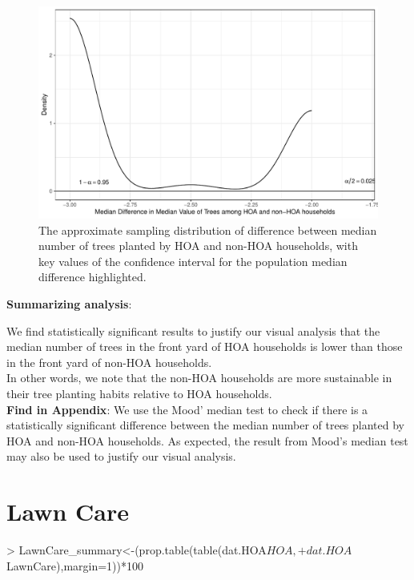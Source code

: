 \documentclass{article}
\begin{document}
\begin{figure}[H]
\centering
\includegraphics{part2-012}
\caption{The approximate sampling distribution of difference between median number of trees planted by HOA and non-HOA households, with key values of the confidence interval for the population median difference highlighted.} \label{Fig:plot1}
\end{figure}

\textbf{Summarizing analysis}: 

We find statistically significant results to justify our visual analysis that the median number of trees in the front yard of HOA households is lower than those in the front yard of non-HOA households.\\

In other words, we note that the non-HOA households are more sustainable in their tree planting habits relative to HOA households.\\

\textbf{Find in Appendix}: We use the Mood' median test to check if there is a statistically significant difference between the median number of trees planted by HOA and non-HOA households. As expected, the result from Mood's median test may also be used to justify our visual analysis.

\section*{Lawn Care}

\begin{Schunk}
\begin{Sinput}
> LawnCare_summary<-(prop.table(table(dat.HOA$HOA,
+                                     dat.HOA$LawnCare),margin=1))*100
\end{Sinput}
\end{Schunk}
\end{document}
